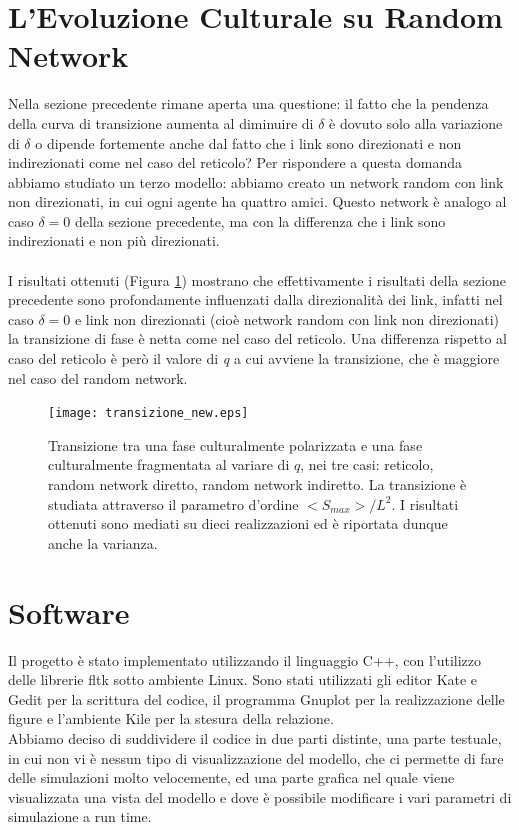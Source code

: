 \documentclass[a4paper,12pt]{article}
\begin{document}
\clearpage

\section{L'Evoluzione Culturale su Random Network}
Nella sezione precedente rimane aperta una questione: il fatto che la pendenza della curva di transizione aumenta al diminuire di 
$\delta$ \`{e} dovuto solo alla variazione di $\delta$ o dipende fortemente anche dal fatto che i link sono direzionati e non indirezionati
come nel caso del reticolo?
Per rispondere a questa domanda abbiamo studiato un terzo modello: abbiamo creato un network random con link non direzionati, in cui ogni agente ha quattro amici.
Questo network \`{e} analogo al caso $\delta = 0$ della sezione precedente, ma con la differenza che i link sono indirezionati e non pi\`{u} direzionati.
\\ \\I risultati ottenuti (Figura \ref{transiz_new}) mostrano che effettivamente i risultati della sezione precedente sono
profondamente influenzati dalla direzionalit\`{a} dei link, infatti nel caso $\delta = 0$ e link non direzionati (cio\`{e} network random con link non direzionati)
la transizione di fase \`{e} netta come nel caso del reticolo. Una differenza rispetto al caso del reticolo \`{e} per\`{o} il valore di
\textit{q} a cui avviene la transizione, che \`{e} maggiore nel caso del random network.

\begin{figure}[!ht]
\begin{center}
\texttt{[image: transizione\_new.eps]}
\end{center}
\caption{Transizione tra una fase culturalmente polarizzata e una fase culturalmente fragmentata al variare di $q$, nei tre casi: reticolo, random network diretto, random network indiretto. La transizione \`{e} studiata attraverso il parametro d'ordine $<S_{max}>/L^2$. I risultati ottenuti sono mediati su dieci realizzazioni ed \`{e} riportata dunque anche la varianza.}
\label{transiz_new}
\end{figure}

\clearpage

\section{Software}
Il progetto \`e stato implementato utilizzando il linguaggio C++, con l'utilizzo delle librerie fltk sotto ambiente Linux. Sono stati
utilizzati gli editor Kate e Gedit per la scrittura del codice, il programma Gnuplot per la realizzazione delle figure e l'ambiente Kile per
la stesura della relazione.\\
Abbiamo deciso 
di suddividere il codice in due parti distinte, una parte testuale, in cui non vi \`e nessun tipo di visualizzazione del modello, che ci 
permette di fare delle simulazioni molto velocemente, ed una parte grafica nel quale viene visualizzata una vista del modello e dove \`e 
possibile modificare i vari parametri di simulazione a run time.
\end{document}
